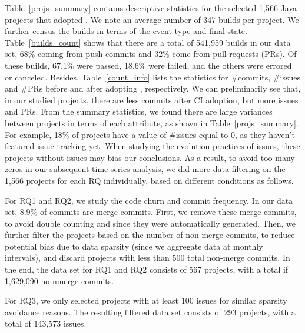 Table~\ref{projs_summary} contains descriptive statistics for the selected 
1,566 Java projects that adopted \Tvis. 
We note an average number of 347 builds per project. 
We further census the builds in terms of the event type and final state. 
Table~\ref{builds_count} shows that there are a total of 541,959 builds in 
our data set, 68\% coming from push commits and 32\% come from pull 
requests (PRs). 
Of these builds, 67.1\% were passed, 18.6\% were failed, and the others 
were errored or canceled. 
Besides, Table~\ref{count_info} lists the statistics for \#commits, \#issues 
and \#PRs before and after adopting \Tvis, respectively. 
We can preliminarily see that, in our studied projects, there are less commits 
after CI adoption, but more issues and PRs. 
From the summary statistics, we found there are large variances between 
projects in terms of each attribute, as shown in Table~\ref{projs_summary}. 
For example, 18\% of projects have a value of \#issues equal to 0, as they 
haven't featured \GH issue tracking yet. 
When studying the evolution practices of issues, these projects without 
issues may bias our conclusions. 
As a result, to avoid too many zeros in our subsequent time series analysis, 
we did more data filtering on the 1,566 projects for each RQ individually, 
based on different conditions as follows.

For RQ1 and RQ2, we study the code churn and commit frequency. 
In our data set, 8.9\% of commits are merge commits. 
First, we remove these merge commits, to avoid double counting and since 
they were automatically generated. 
Then, we further filter the projects based on the number of non-merge commits,
to reduce potential bias due to data sparsity (since we aggregate data at 
monthly intervals), and discard projects with less than 500 total non-merge 
commits.
In the end, the data set for RQ1 and RQ2 consists of 567 projects, with a 
total if 1,629,090 no-nmerge commits.

For RQ3, we only selected projects with at least 100 issues for similar sparsity 
avoidance reasons. 
The resulting filtered data set consists of 293 projects, with a total of 143,573 
\GH issues.

